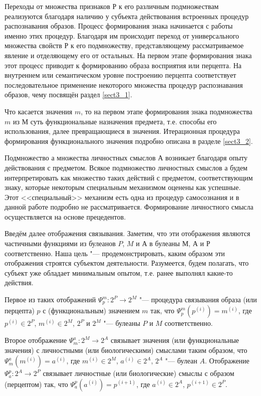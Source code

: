 Переходы от множества признаков $Р$ к его различным подмножествам реализуются благодаря наличию у субъекта действования встроенных процедур распознавания образов. Процесс формирования знака начинается с работы именно этих процедур. Благодаря им происходит переход от универсального множества свойств $Р$ к его подмножеству, представляющему рассматриваемое явление и отделяющему его от остальных. На первом этапе формирования знака этот процесс приводит к формированию образа восприятия или перцепта. На внутреннем или семантическом уровне построению перцепта соответствует последовательное применение некоторого множества процедур распознавания образов, чему посвящён раздел \ref{sect3_1}.

Что касается значения $m$, то на первом этапе формирования знака подмножества $m$ из $М$ суть функциональные назначения предмета, т.е. способы его использования, далее превращающиеся в значения. Итерационная процедура формирования функционального значения подробно описана в разделе \ref{sect3_2}.

Подмножество $а$ множества личностных смыслов $А$ возникает благодаря опыту действования с предметом. Всякое подмножество личностных смыслов а будем интерпретировать как множество таких действий с предметом, соответствующим знаку, которые некоторым специальным механизмом оценены как успешные. Этот <<специальный>> механизм есть одна из процедур самосознания и в данной работе подробно не рассматривается. Формирование личностного смысла осуществляется на основе прецедентов.

Введём далее отображения связывания. Заметим, что эти отображения являются частичными функциями из булеанов $P$, $M$ и $А$ в булеаны $М$, $А$ и $Р$ соответственно. Наша цель "--- продемонстрировать, каким образом эти отображения строятся субъектом деятельности. Разумеется, будем полагать, что субъект уже обладает минимальным опытом, т.е. ранее выполнял какие-то действия.

Первое из таких отображений $\Psi_p^m:2^P\rightarrow 2^M$ "--- процедура связывания образа (или перцепта) $p$ с (функциональным) значением $m$ так, что $\Psi_p^m(p^{(i)})=m^{(i)}$, где $p^{(i)}\in 2^P$, $m^{(i)}\in 2^M$, $2^P$ и $2^M$ "--- булеаны $P$ и $M$ соответственно.

Второе отображение $\Psi_m^a:2^M\rightarrow 2^A$ связывает значения (или функциональные значения) с личностными (или биологическими) смыслами таким образом, что $\Psi_m^a(m^{(i)})=a^{(i)}$, где $m^{(i)}\in 2^M$, $a^{(i)}\in 2^A$, $2^A$ "--- булеан $A$. Отображение $\Psi_a^p:2^A\rightarrow 2^P$ связывает личностные (или биологические) смыслы с образом (перцептом) так, что $\Psi_a^p(a^{(i)})=p^{(i+1)}$, где $a^{(i)}\in 2^A$, $p^{(i+1)}\in 2^P$.

